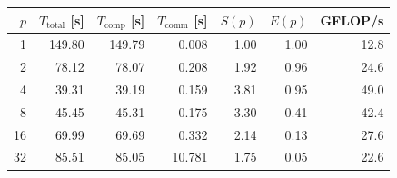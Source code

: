 \begin{tabular}{rrrrrrr}
\toprule
$p$ & $T_{\text{total}}$ [s] & $T_{\text{comp}}$ [s] & $T_{\text{comm}}$ [s] & $S(p)$ & $E(p)$ & GFLOP/s \\
\midrule
1 & 149.80 & 149.79 & 0.008 & 1.00 & 1.00 & 12.8 \\
2 & 78.12 & 78.07 & 0.208 & 1.92 & 0.96 & 24.6 \\
4 & 39.31 & 39.19 & 0.159 & 3.81 & 0.95 & 49.0 \\
8 & 45.45 & 45.31 & 0.175 & 3.30 & 0.41 & 42.4 \\
16 & 69.99 & 69.69 & 0.332 & 2.14 & 0.13 & 27.6 \\
32 & 85.51 & 85.05 & 10.781 & 1.75 & 0.05 & 22.6 \\
\bottomrule
\end{tabular}
